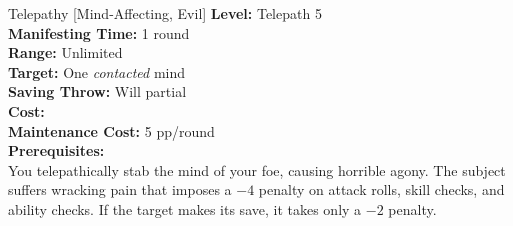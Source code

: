 {Telepathy [Mind-Affecting, Evil]}
{
	\textbf{Level:}
	Telepath 5\\
	\textbf{Manifesting Time:}
	1 round\\
	\textbf{Range:}
	Unlimited\\
	\textbf{Target:}
	One \emph{contacted} mind\\
	\textbf{Saving Throw:}
	Will partial\\
	\textbf{Cost:}
	\\
	\textbf{Maintenance Cost:}
	5 pp/round\\
	\textbf{Prerequisites:}
	\\
}
{
	You telepathically stab the mind of your foe, causing horrible agony. The subject suffers wracking pain that imposes a $-4$ penalty on attack rolls, skill checks, and ability checks. If the target makes its save, it takes only a $-2$ penalty.
}
